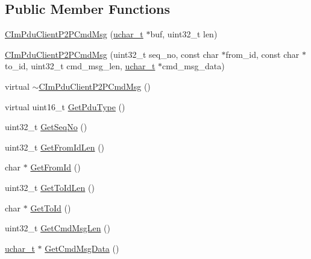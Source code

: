 \subsection*{Public Member Functions}
\begin{DoxyCompactItemize}
\item 
\hyperlink{class_c_im_pdu_client_p2_p_cmd_msg_a79bd98286f45001f0b6c77da2b2a4f24}{C\+Im\+Pdu\+Client\+P2\+P\+Cmd\+Msg} (\hyperlink{base_2ostype_8h_a124ea0f8f4a23a0a286b5582137f0b8d}{uchar\+\_\+t} $\ast$buf, uint32\+\_\+t len)
\item 
\hyperlink{class_c_im_pdu_client_p2_p_cmd_msg_a7bf02b56b89e198c73cf1dddfce00aa2}{C\+Im\+Pdu\+Client\+P2\+P\+Cmd\+Msg} (uint32\+\_\+t seq\+\_\+no, const char $\ast$from\+\_\+id, const char $\ast$to\+\_\+id, uint32\+\_\+t cmd\+\_\+msg\+\_\+len, \hyperlink{base_2ostype_8h_a124ea0f8f4a23a0a286b5582137f0b8d}{uchar\+\_\+t} $\ast$cmd\+\_\+msg\+\_\+data)
\item 
virtual \hyperlink{class_c_im_pdu_client_p2_p_cmd_msg_a90e02f0d38d1f93770b3546e616e4863}{$\sim$\+C\+Im\+Pdu\+Client\+P2\+P\+Cmd\+Msg} ()
\item 
virtual uint16\+\_\+t \hyperlink{class_c_im_pdu_client_p2_p_cmd_msg_a5a37864f0cdd51f7696f2e963bcd0089}{Get\+Pdu\+Type} ()
\item 
uint32\+\_\+t \hyperlink{class_c_im_pdu_client_p2_p_cmd_msg_a4b91a2f3086aa6a038ec34851f64e1ba}{Get\+Seq\+No} ()
\item 
uint32\+\_\+t \hyperlink{class_c_im_pdu_client_p2_p_cmd_msg_afff21cc84fb4f183d8ea5f8698892477}{Get\+From\+Id\+Len} ()
\item 
char $\ast$ \hyperlink{class_c_im_pdu_client_p2_p_cmd_msg_a3e4b631aead32141fce745159e0061e8}{Get\+From\+Id} ()
\item 
uint32\+\_\+t \hyperlink{class_c_im_pdu_client_p2_p_cmd_msg_ae3eb164e3d2de6913a6f03fd0fa4b2f0}{Get\+To\+Id\+Len} ()
\item 
char $\ast$ \hyperlink{class_c_im_pdu_client_p2_p_cmd_msg_a0808bcfffdbcb98c10e012eb810bdab3}{Get\+To\+Id} ()
\item 
uint32\+\_\+t \hyperlink{class_c_im_pdu_client_p2_p_cmd_msg_ab2ab04aa6a8a55229900899e5ffd2aac}{Get\+Cmd\+Msg\+Len} ()
\item 
\hyperlink{base_2ostype_8h_a124ea0f8f4a23a0a286b5582137f0b8d}{uchar\+\_\+t} $\ast$ \hyperlink{class_c_im_pdu_client_p2_p_cmd_msg_ab158a8e79e24ca1af7896910589dce33}{Get\+Cmd\+Msg\+Data} ()
\end{DoxyCompactItemize}
